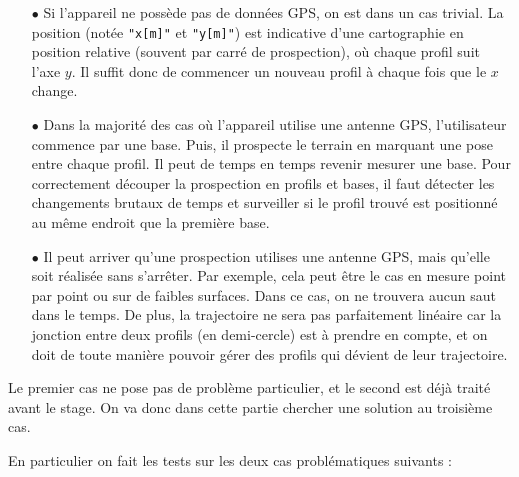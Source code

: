 \documentclass[12pt]{article}
\begin{document}
    \begin{enumerate}
        \item[$\bullet$] Si l'appareil ne possède pas de données GPS, on est dans un cas trivial. La position (notée \texttt{"x[m]"} et \texttt{"y[m]"}) est indicative d'une cartographie en position relative (souvent par carré de prospection), où chaque profil suit l'axe $y$. Il suffit donc de commencer un nouveau profil à chaque fois que le $x$ change.
        \item[$\bullet$] Dans la majorité des cas où l'appareil utilise une antenne GPS, l'utilisateur commence par une base. Puis, il prospecte le terrain en marquant une pose entre chaque profil. Il peut de temps en temps revenir mesurer une base. Pour correctement découper la prospection en profils et bases, il faut détecter les changements brutaux de temps et surveiller si le profil trouvé est positionné au même endroit que la première base.
        \item[$\bullet$] Il peut arriver qu'une prospection utilises une antenne GPS, mais qu'elle soit réalisée sans s'arrêter. Par exemple, cela peut être le cas en mesure point par point ou sur de faibles surfaces. Dans ce cas, on ne trouvera aucun saut dans le temps. De plus, la trajectoire ne sera pas parfaitement linéaire car la jonction entre deux profils (en demi-cercle) est à prendre en compte, et on doit de toute manière pouvoir gérer des profils qui dévient de leur trajectoire.
    \end{enumerate}

    Le premier cas ne pose pas de problème particulier, et le second est déjà traité avant le stage. On va donc dans cette partie chercher une solution au troisième cas.

    En particulier on fait les tests sur les deux cas problématiques suivants :
\end{document}
